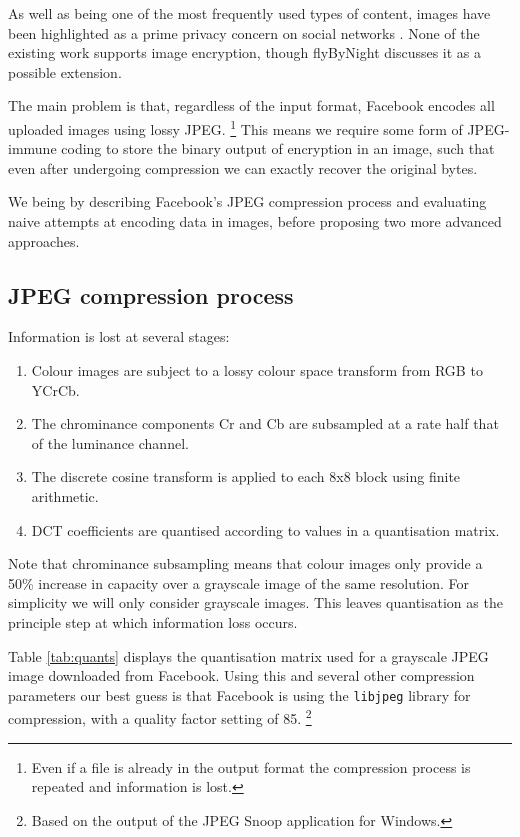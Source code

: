 As well as being one of the most frequently used types of content, images have been highlighted as a prime privacy concern on social networks \cite{fb-images}. None of the existing work supports image encryption, though flyByNight discusses it as a possible extension.

The main problem is that, regardless of the input format, Facebook encodes all uploaded images using lossy JPEG. \footnote{Even if a file is already in the output format the compression process is repeated and information is lost.} This means we require some form of JPEG-immune coding to store the binary output of encryption in an image, such that even after undergoing compression we can exactly recover the original bytes.

We being by describing Facebook's JPEG compression process and evaluating naive attempts at encoding data in images, before proposing two more advanced approaches.

\FloatBarrier
\subsection{JPEG compression process}

Information is lost at several stages:

\begin{enumerate}

    \item Colour images are subject to a lossy colour space transform from RGB to YCrCb.
    \item The chrominance components Cr and Cb are subsampled at a rate half that of the luminance channel.
    \item The discrete cosine transform is applied to each 8x8 block using finite arithmetic.
    \item DCT coefficients are quantised according to values in a quantisation matrix.
    
\end{enumerate}

Note that chrominance subsampling means that colour images only provide a 50\% increase in capacity over a grayscale image of the same resolution. For simplicity we will only consider grayscale images. This leaves quantisation as the principle step at which information loss occurs.

Table \ref{tab:quants} displays the quantisation matrix used for a grayscale JPEG image downloaded from Facebook. Using this and several other compression parameters our best guess is that Facebook is using the {\tt libjpeg} library for compression, with a quality factor setting of 85. \footnote{Based on the output of the JPEG Snoop application for Windows.}

